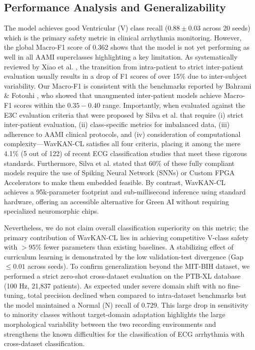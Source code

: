 \documentclass[pdflatex,sn-mathphys-num]{sn-jnl}
\theoremstyle{thmstyleone}
\theoremstyle{thmstyletwo}
\theoremstyle{thmstylethree}
\begin{document}
\subsection{Performance Analysis and Generalizability}
The model achieves good Ventricular (V) class recall ($0.88 \pm 0.03$ across 20 seeds) which is the primary safety metric in clinical arrhythmia monitoring. However, the global Macro-F1 score of 0.362 shows that the model is not yet performing as well in all AAMI superclasses highlighting a key limitation. As systematically reviewed by Xiao et al. \cite{xiao_deep_2023}, the transition from intra-patient to strict inter-patient evaluation usually results in a drop of F1 scores of over 15\% due to inter-subject variability. Our Macro-F1 is consistent with the benchmarks reported by Bahrami \& Fotouhi \cite{bahrami_investigation_2025}, who showed that unaugmented inter-patient models achieve Macro-F1 scores within the $0.35 - 0.40$ range. Importantly, when evaluated against the E3C evaluation criteria that were proposed by Silva et al. \cite{silva_systematic_2025} that require (i) strict inter-patient evaluation, (ii) class-specific metrics for imbalanced data, (iii) adherence to AAMI clinical protocols, and (iv) consideration of computational complexity---WavKAN-CL satisfies all four criteria, placing it among the mere 4.1\% (5 out of 122) of recent ECG classification studies that meet these rigorous standards. Furthermore, Silva et al. stated that 60\% of these fully compliant models require the use of Spiking Neural Network (SNNs) or Custom FPGA Accelerators to make them embedded feasible. By contrast, WavKAN-CL achieves a 95k-parameter footprint and sub-millisecond inference using standard hardware, offering an accessible alternative for Green AI without requiring specialized neuromorphic chips.

Nevertheless, we do not claim overall classification superiority on this metric; the primary contribution of WavKAN-CL lies in achieving competitive V-class safety with $>95\%$ fewer parameters than existing baselines. A stabilizing effect of curriculum learning is demonstrated by the low validation-test divergence (Gap $\le 0.01$ across seeds). To confirm generalization beyond the MIT-BIH dataset, we performed a strict zero-shot cross-dataset evaluation on the PTB-XL database (100 Hz, 21,837 patients). As expected under severe domain shift with no fine-tuning, total precision declined when compared to intra-dataset benchmarks but the model maintained a Normal (N) recall of 0.729. This large drop in sensitivity to minority classes without target-domain adaptation highlights the large morphological variability between the two recording environments and strengthens the known difficulties for the classification of ECG arrhythmia with cross-dataset classification.
\end{document}
